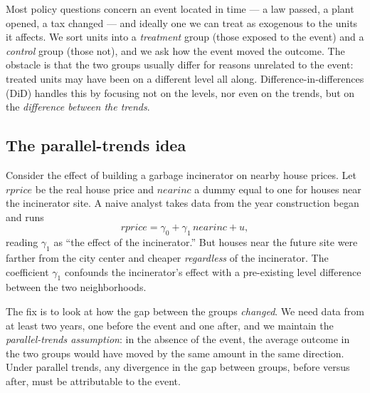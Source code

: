 Most policy questions concern an event located in time --- a law passed, a plant opened, a tax changed --- and ideally one we can treat as exogenous to the units it affects. We sort units into a \emph{treatment} group (those exposed to the event) and a \emph{control} group (those not), and we ask how the event moved the outcome. The obstacle is that the two groups usually differ for reasons unrelated to the event: treated units may have been on a different level all along. Difference-in-differences (DiD) handles this by focusing not on the levels, nor even on the trends, but on the \emph{difference between the trends}.

\subsection{The parallel-trends idea}

Consider the effect of building a garbage incinerator on nearby house prices. Let $rprice$ be the real house price and $nearinc$ a dummy equal to one for houses near the incinerator site. A naive analyst takes data from the year construction began and runs
\[
rprice = \gamma_0 + \gamma_1\, nearinc + u,
\]
reading $\gamma_1$ as ``the effect of the incinerator.'' But houses near the future site were farther from the city center and cheaper \emph{regardless} of the incinerator. The coefficient $\gamma_1$ confounds the incinerator's effect with a pre-existing level difference between the two neighborhoods.

The fix is to look at how the gap between the groups \emph{changed}. We need data from at least two years, one before the event and one after, and we maintain the \emph{parallel-trends assumption}: in the absence of the event, the average outcome in the two groups would have moved by the same amount in the same direction. Under parallel trends, any divergence in the gap between groups, before versus after, must be attributable to the event.


